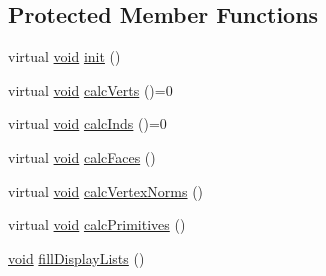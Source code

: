 \subsection*{Protected Member Functions}
\begin{DoxyCompactItemize}
\item 
virtual \hyperlink{glutf90_8h_ac778d6f63f1aaf8ebda0ce6ac821b56e}{void} \hyperlink{class_geom_base_ad5bf288e10ecdb5dbd274a11c77768fc}{init} ()
\item 
virtual \hyperlink{glutf90_8h_ac778d6f63f1aaf8ebda0ce6ac821b56e}{void} \hyperlink{class_geom_base_a2d4e1dd21534e89978ec7f7c8268a20b}{calc\-Verts} ()=0
\item 
virtual \hyperlink{glutf90_8h_ac778d6f63f1aaf8ebda0ce6ac821b56e}{void} \hyperlink{class_geom_base_a7eb4db1216fe90f25387fc20b9d77c8f}{calc\-Inds} ()=0
\item 
virtual \hyperlink{glutf90_8h_ac778d6f63f1aaf8ebda0ce6ac821b56e}{void} \hyperlink{class_geom_base_a659196826d2409ac115cf5ae9ed0b625}{calc\-Faces} ()
\item 
virtual \hyperlink{glutf90_8h_ac778d6f63f1aaf8ebda0ce6ac821b56e}{void} \hyperlink{class_geom_base_ab7d23639ed6d570a373d82fa4726307b}{calc\-Vertex\-Norms} ()
\item 
virtual \hyperlink{glutf90_8h_ac778d6f63f1aaf8ebda0ce6ac821b56e}{void} \hyperlink{class_geom_base_ac3b8d29efc624fe705729b58db87a4ed}{calc\-Primitives} ()
\item 
\hyperlink{glutf90_8h_ac778d6f63f1aaf8ebda0ce6ac821b56e}{void} \hyperlink{class_geom_base_ae282e9f026e7c2cafddbac779917e292}{fill\-Display\-Lists} ()
\end{DoxyCompactItemize}
